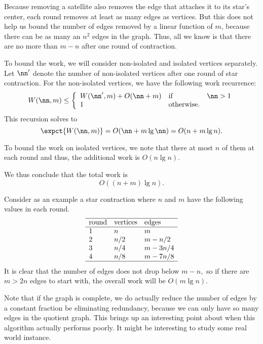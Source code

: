 \begin{group}
\begin{gram}
%
Because removing a satellite also removes the edge that attaches it to
its star's center, each round  removes at least as many edges as vertices.  
%
But this does not help us bound
the number of edges removed by a linear function of $m$, because there
can be as many an $n^2$ edges in the graph.
%
Thus, all we know is that there are no more than $m-n$ after one
round of contraction.

To bound the work, we will consider non-isolated and isolated vertices
separately.
%
Let $\nn'$  denote the  number of non-isolated vertices after one
round of star contraction.
%
For the non-isolated vertices, we have the following work recurrence:
\[
\begin{array}{lll}
W(\nn, m) 
\leq 
\left\{
\begin{array}{lll}
W(\nn', m) + O(\nn+m) & \mbox{if} & \nn > 1
\\
1 & \mbox{otherwise.}
\end{array}
\right.
\end{array}
\]
%
This recursion solves to
\[
\expct{W(\nn,m)} = O(\nn + m\lg \nn) = O(n + m \lg{n}).
\]

To bound the work on isolated vertices, we note that there at most $n$
of them at each round and thus, the additional work is $O(n \lg{n}).$

We thus conclude that the total work is
\[
O((n + m)\lg{n}).
\]
\end{gram}

\begin{note}
Consider as an example a star contraction where $n$ and $m$ have the
following values in each round.
\[
\begin{array}{lll}
\hline
 \mbox{round} & \mbox{vertices} & \mbox{edges}
\\
\hline
 1 & n & m 
\\
 2 & n/2 & m - n/2 
\\
 3 & n/4 & m - 3n/4 
\\
 4 & n/8 & m - 7n/8 
\\
\hline
 \end{array}
\]
It is clear that the number of edges does not drop below $m-n,$ so if
there are $m > 2n$ edges to start with, the overall work will be $O(m
\lg n)$.
%
\end{note}
%
\end{group}

\begin{teachnote}
Note that if the graph is complete, we do actually reduce the number
of edges by a constant fraction be eliminating redundancy, because we
can only have so many edges in the quotient graph. This brings up an
interesting point about when this algorithm actually performs poorly.
It might be interesting to study some real world instance.
\end{teachnote}

